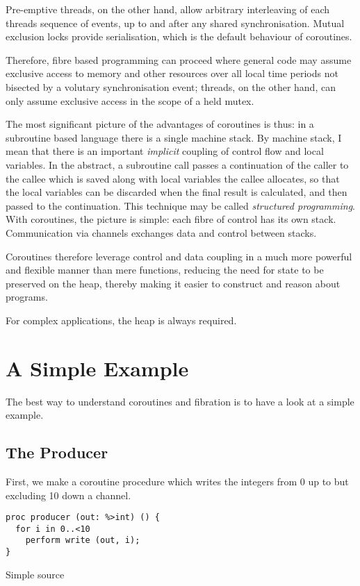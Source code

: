 \documentclass[oneside]{book}
\begin{document}
Pre-emptive threads, on the other hand, allow arbitrary interleaving of
each threads sequence of events, up to and after any shared synchronisation.
Mutual exclusion locks provide serialisation, which is the default behaviour
of coroutines.

Therefore, fibre based programming can proceed where general code
may assume exclusive access to memory and other resources over all
local time periods not bisected by a volutary synchronisation event;
threads, on the other hand, can only assume exclusive access in the
scope of a held mutex.


The most significant picture of the advantages of coroutines is thus: in a subroutine
based language there is a single machine stack. By machine stack, I mean that
there is an important {\em implicit} coupling of control flow and local variables.
In the abstract, a subroutine call passes a continuation of the caller to 
the callee which is saved along with local variables the callee allocates,
so that the local variables can be discarded when the final result is
calculated, and then passed to the continuation. This technique may be
called {\em structured programming}. With coroutines, the picture is simple:
each fibre of control has its own stack. Communication via channels exchanges data
and control between stacks.

Coroutines therefore leverage control and data coupling in a much more
powerful and flexible manner than mere functions, reducing the need for
state to be preserved on the heap, thereby making it easier to construct
and reason about programs.

For complex applications, the heap is always required.


\section{A Simple Example}
The best way to understand coroutines and fibration is to have a look
at a simple example. 

\subsection{The Producer}
First, we make a coroutine procedure which writes the integers
from 0 up to but excluding 10 down a channel.

\begin{listing}
\begin{verbatim}
proc producer (out: %>int) () {
  for i in 0..<10 
    perform write (out, i);
}
\end{verbatim}
\caption{Simple source}
\label{lst:Simple source}
\end{listing}
\end{document}
